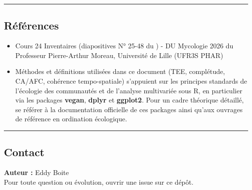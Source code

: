 \begin{center}\rule{0.5\linewidth}{0.5pt}\end{center}

\subsection{Références}\label{ruxe9fuxe9rences}

\begin{itemize}
\tightlist
\item
  Cours 24 Inventaires (diapositives N° 25-48 du ) - DU Mycologie 2026
  du Professeur Pierre-Arthur Moreau, Université de Lille (UFR3S PHAR)
\item
  Méthodes et définitions utilisées dans ce document (TEE, complétude,
  CA/AFC, cohérence tempo-spatiale) s'appuient sur les principes
  standards de l'écologie des communautés et de l'analyse multivariée
  sous R, en particulier via les packages \textbf{vegan}, \textbf{dplyr}
  et \textbf{ggplot2}. Pour un cadre théorique détaillé, se référer à la
  documentation officielle de ces packages ainsi qu'aux ouvrages de
  référence en ordination écologique.
\end{itemize}

\begin{center}\rule{0.5\linewidth}{0.5pt}\end{center}

\subsection{Contact}\label{contact}

\textbf{Auteur :} Eddy Boite\\
Pour toute question ou évolution, ouvrir une issue sur ce dépôt.
